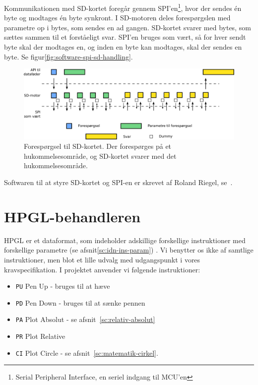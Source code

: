 Kommunikationen med SD-kortet foregår gennem SPI'en\footnote{Serial
  Peripheral Interface, en seriel indgang til MCU'en}, hvor der sendes
én byte og modtages én byte synkront. I SD-motoren deles forespørgslen
med parametre op i bytes, som sendes en ad gangen. SD-kortet svarer
med bytes, som sættes sammen til et forståeligt svar. SPI'en bruges
som vært, så for hver sendt byte skal der modtages en, og inden en
byte kan modtages, skal der sendes en byte. Se
figur\vref{fig:software-spi-sd-handling}.

\begin{figure}[htbp]
  \centering
  \includegraphics[width=\textwidth]{../brugere/kjaergaard/datafeeder-handling}
  \caption{Forespørgsel til SD-kortet. Der forespørges på et
    hukommelsesområde, og SD-kortet svarer med det hukommelsesområde.}
  \label{fig:software-spi-sd-handling}
\end{figure}


Softwaren til at styre SD-kortet og SPI-en er skrevet af Roland
Riegel, se~\cite{bbt:sd-software}.


\section{HPGL-behandleren}


HPGL er et dataformat, som indeholder adskillige forskellige
instruktioner med forskellige parametre (se
afsnit\vref{sc:idn-ins-param}) . Vi benytter os ikke af samtlige
instruktioner, men blot et lille udvalg med udgangspunkt i vores
kravspecifikation. I projektet anvender vi følgende instruktioner:

\begin{itemize} \firmlist
\item \texttt{PU} Pen Up - bruges til at hæve
\item \texttt{PD} Pen Down - bruges til at sænke pennen
\item \texttt{PA} Plot Absolut - se afsnit~\vref{sc:relativ-absolut}
\item \texttt{PR} Plot Relative
\item \texttt{CI} Plot Circle - se afsnit~\vref{sc:matematik-cirkel}.
\end{itemize}

